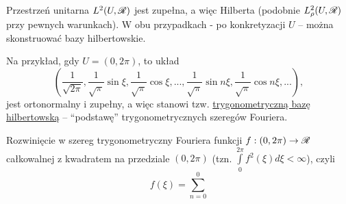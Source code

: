 \begin{example}
   Przestrzeń unitarna $L^2(U, \mathscr{R})$ jest zupełna, a więc Hilberta (podobnie $L^2_\rho(U, \mathscr{R})$ przy pewnych warunkach). W obu przypadkach - po konkretyzacji $U$ -- można skonstruować bazy hilbertowskie.
   
   Na przykład, gdy $U = (0, 2 \pi)$, to układ
   \[\left(\frac{1}{\sqrt{2\pi}}, \frac{1}{\sqrt{\pi}}\sin \xi, \frac{1}{\sqrt{\pi}} \cos \xi, ..., \frac{1}{\sqrt{\pi}} \sin n\xi, \frac{1}{\sqrt{\pi}} \cos n \xi, ... \right),\]
   jest ortonormalny i zupełny, a więc stanowi tzw. \underline{trygonometryczną bazę hilbertowską} -- ``podstawę'' trygonometrycznych szeregów Fouriera.
   
   Rozwinięcie w szereg trygonometryczny Fouriera funkcji $f: (0,2\pi) \to \mathscr{R}$ całkowalnej z kwadratem na przedziale $(0, 2\pi)$ (tzn. $\int\limits_0^{2\pi} f^2(\xi) d\xi < \infty$),
   czyli
   \[f(\xi) = \sum\limits_{n=0}^{0}\]
\end{example}
